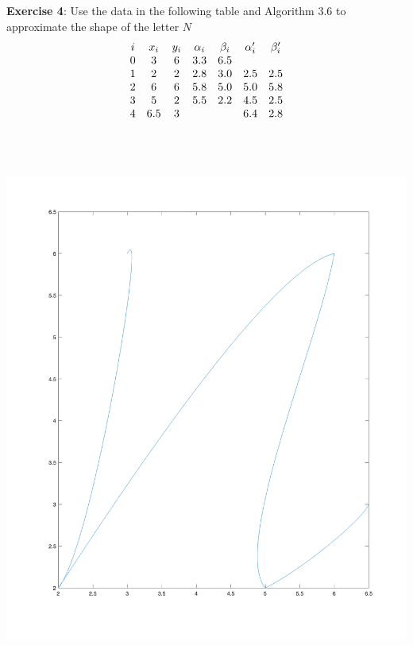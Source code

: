 \documentclass{article}
\begin{document}
\textbf{Exercise 4}: Use the data in the following table and Algorithm $3.6$ to approximate the shape of the letter $N$
    \begin{align*}
        \begin{array}{ c c c c c c c }
            i & x_{i} & y_{i} & \alpha_{i} & \beta_{i} & \alpha^{\prime}_{i} & \beta^{\prime}_{i} \\
            0 & 3     & 6     & 3.3        & 6.5       &                     &                    \\
            1 & 2     & 2     & 2.8        & 3.0       & 2.5                 & 2.5                \\
            2 & 6     & 6     & 5.8        & 5.0       & 5.0                 & 5.8                \\
            3 & 5     & 2     & 5.5        & 2.2       & 4.5                 & 2.5                \\
            4 & 6.5   & 3     &            &           & 6.4                 & 2.8                  
        \end{array}
    \end{align*}
    \inputminted{matlab}{./code/Bezier/Bezier.m}
    \inputminted{matlab}{./code/Bezier/BezierCurves.m}
    \inputminted{matlab}{./code/Bezier/BezierPolys.m}
    \inputminted{matlab}{./code/script1.m}
    \includegraphics[height=\textwidth]{./figures/letterN.png}
\end{document}
